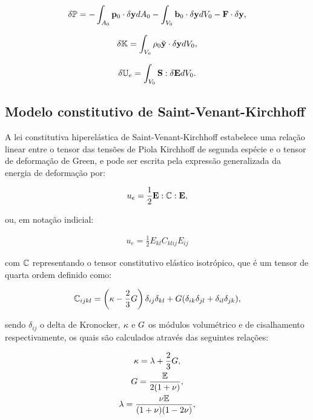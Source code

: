 \begin{align}
	 \delta\mathbb{P} = - \int_{A_{0}} \mathbf{p}_{0} \cdot \delta\mathbf{y} dA_{0} - \int_{V_{0}}  \mathbf{b}_0 \cdot \delta\mathbf{y} dV_{0} - \mathbf{F} \cdot \delta\mathbf{y},
\end{align}

\begin{align}
	\delta\mathbb{K} = \int_{V_{0}} \rho_{0} \ddot{\mathbf{y}} \cdot \delta\mathbf{y} dV_{0},
\end{align}

\begin{align}
	 \delta\mathbb{U}_e = \int_{V_{0}} \mathbf{S} : \delta\mathbf{E} dV_{0}.
\end{align}

\subsection{Modelo constitutivo de Saint-Venant-Kirchhoff}

A lei constitutiva hiperelástica de Saint-Venant-Kirchhoff estabelece uma relação linear entre o tensor das tensões de Piola Kirchhoff de segunda espécie e o tensor de deformação de Green, e pode ser escrita pela expressão generalizada da energia de deformação por:

\begin{align}
u_{e} = \frac{1}{2} \mathbf{E} : \mathbb{C} : \mathbf{E},
\end{align}

\noindent ou, em notação indicial:

\begin{align}
u_{e} = \frac{1}{2} E_{kl} C_{klij} E_{ij}
\end{align}

\noindent com $\mathbb{C}$ representando o tensor constitutivo elástico isotrópico, que é um tensor de quarta ordem definido como:

\begin{gather}
\mathbb{C}_{ijkl}=\left(\kappa - \frac{2}{3}G \right)\delta_{ij}\delta_{kl} + G(\delta_{ik}\delta_{jl}+\delta_{il}\delta_{jk}),
\end{gather}

\noindent sendo $\delta_{ij}$ o delta de Kronocker, $\kappa$ e $G$ os módulos volumétrico e de cisalhamento respectivamente, os quais são calculados através das seguintes relações:

\begin{gather}
\kappa=\lambda+\frac{2}{3}G,\\
G=\frac{\mathbb{E}}{2(1+\nu)},\\
\lambda=\frac{\nu \mathbb{E}}{(1+\nu)(1-2\nu)},
\end{gather}

